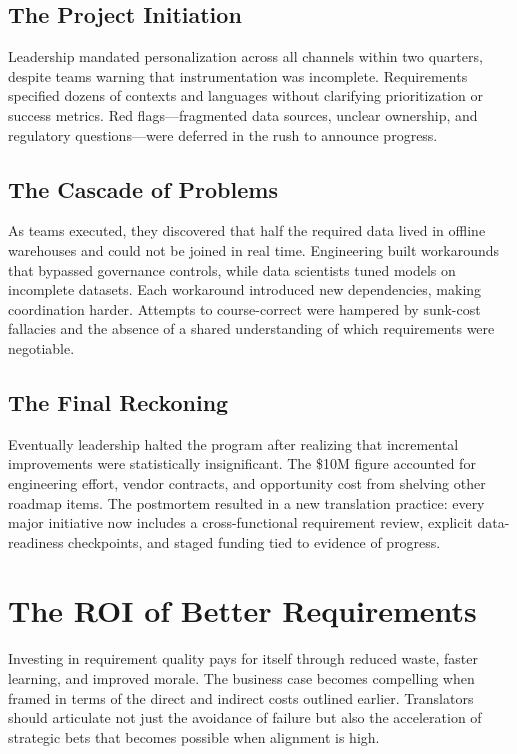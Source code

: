 \subsection{The Project Initiation}
Leadership mandated personalization across all channels within two quarters, despite teams warning that instrumentation was incomplete. Requirements specified dozens of contexts and languages without clarifying prioritization or success metrics. Red flags---fragmented data sources, unclear ownership, and regulatory questions---were deferred in the rush to announce progress.

\subsection{The Cascade of Problems}
As teams executed, they discovered that half the required data lived in offline warehouses and could not be joined in real time. Engineering built workarounds that bypassed governance controls, while data scientists tuned models on incomplete datasets. Each workaround introduced new dependencies, making coordination harder. Attempts to course-correct were hampered by sunk-cost fallacies and the absence of a shared understanding of which requirements were negotiable.

\subsection{The Final Reckoning}
Eventually leadership halted the program after realizing that incremental improvements were statistically insignificant. The \$10M figure accounted for engineering effort, vendor contracts, and opportunity cost from shelving other roadmap items. The postmortem resulted in a new translation practice: every major initiative now includes a cross-functional requirement review, explicit data-readiness checkpoints, and staged funding tied to evidence of progress.

\section{The ROI of Better Requirements}
\label{sec:roi-better}

Investing in requirement quality pays for itself through reduced waste, faster learning, and improved morale. The business case becomes compelling when framed in terms of the direct and indirect costs outlined earlier. Translators should articulate not just the avoidance of failure but also the acceleration of strategic bets that becomes possible when alignment is high.

